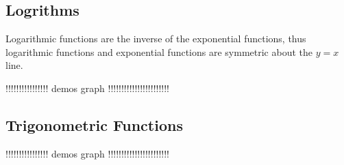 \documentclass{article}
\begin{document}
\subsection*{Logrithms}
Logarithmic functions are the inverse of the exponential functions, thus logarithmic functions and exponential functions are symmetric about the $y=x$ line.
\begin{center}
	!!!!!!!!!!!!!!!! demos graph !!!!!!!!!!!!!!!!!!!!!!!
\end{center}

\subsection*{Trigonometric Functions}
\begin{center}
	!!!!!!!!!!!!!!!! demos graph !!!!!!!!!!!!!!!!!!!!!!!
\end{center}
\end{document}
